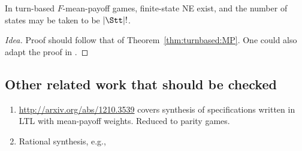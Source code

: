 \begin{conjecture}
In turn-based $F$-mean-payoff games, finite-state NE exist, and the number of states may be taken to be $|\Stt|!$. 
\end{conjecture}
\begin{proof}[Idea]
Proof should follow that of Theorem~\ref{thm:turnbased:MP}. One could also adapt the proof in \cite{AmRu14}.
\end{proof}








  




	












\subsection{Other related work that should be checked}

\begin{enumerate}
 \item \url{http://arxiv.org/abs/1210.3539} covers synthesis of specifications written in LTL with mean-payoff weights. Reduced to parity games.
\item Rational synthesis, e.g., \cite{CFRR16}

\end{enumerate}













